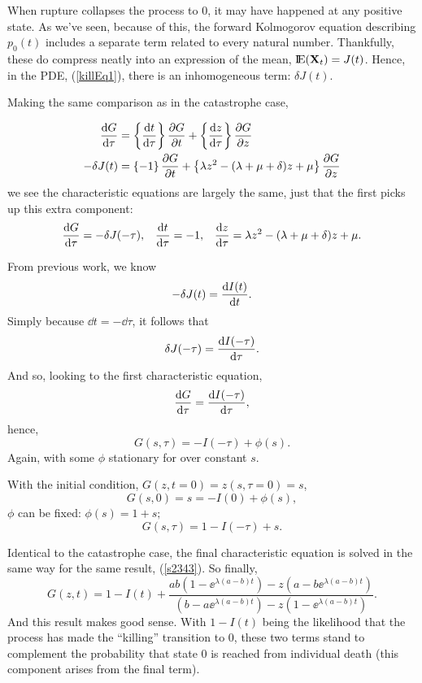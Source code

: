 When rupture collapses the process to 0, it may have happened at any positive state.  As we've seen, because of this, the forward Kolmogorov equation describing $p_0(t)$ includes a separate term related to every natural number. Thankfully, these do compress neatly into an expression of the mean, ${\rm I}\!{\rm E}({{\bf X}_t}) = J(t)$. Hence, in the PDE, (\ref{killEq1}), there is an inhomogeneous term: $\delta J(t)$.\par
Making the same comparison as in the catastrophe case, 

\begin{align*}
\displaystyle\frac{{\rm d} G}{{\rm d} \tau} &=  \left\{\displaystyle\frac{{\rm d} t}{{\rm d} \tau}\right\}  \displaystyle\frac{\partial G}{\partial t}+ \left\{\displaystyle\frac{{\rm d} z}{{\rm d} \tau} \right\}\displaystyle\frac{\partial G}{\partial z}\\
-\delta J(t)&=  \left\{- 1\right\}\displaystyle\frac{\partial G}{\partial t} + \left\{\lambda z^2 -( \lambda + \mu + \delta)z + \mu\right\} \displaystyle\frac{\partial G}{\partial z}
\end{align*}
we see the characteristic equations are largely the same, just that the first picks up this extra component: 
\begin{align*}
\label{Char2}
\displaystyle\frac{{\rm d} G}{{\rm d} \tau} = -\delta J(-\tau),&& \displaystyle\frac{{\rm d} t}{{\rm d} \tau} = -1, && \displaystyle\frac{{\rm d} z}{{\rm d} \tau} = \lambda z^2 - (\lambda + \mu + \delta)z + \mu.
\end{align*}



\noindent
From previous work, we know 
$$-\delta J(t) = \displaystyle\frac{{\rm d} I(t)}{{\rm d} t}.$$
Simply because $\dd t = -\dd \tau$, it follows that 
$$\delta J(-\tau) = \displaystyle\frac{{\rm d} I(-\tau)}{{\rm d} \tau}.$$
And so, looking to the first characteristic equation, 
$$\displaystyle\frac{{\rm d} G}{{\rm d} \tau} = \displaystyle\frac{{\rm d} I(-\tau)}{{\rm d} \tau},$$
hence,
$$G(s,\tau) = -I(-\tau) + \phi(s).$$
Again, with some $\phi$ stationary for over constant $s$. \par
With the initial condition, $G(z, t=0) = z(s, \tau = 0) = s$,
$$G(s,0) =s= -I(0) + \phi(s),$$
$\phi$ can be fixed: $\phi(s) = 1 + s;$
$$G(s,\tau) = 1 - I(-\tau) + s.$$\par
Identical to the catastrophe case, the final characteristic equation is solved in the same way for the same result, (\ref{s2343}). So finally,
$$G(z,t) = 1 - I(t)  + \frac{ab(1-\ee^{\lambda(a-b) t}) - z(a-b\ee^{\lambda(a-b) t}) } {  (b-a\ee^{\lambda(a-b) t}) -z(1-\ee^{\lambda(a-b) t})  }.$$
And this result makes good sense. With $1 - I(t)$ being the likelihood that the process has made the ``killing'' transition to 0, these two terms stand to complement the probability that state $0$ is reached from individual death (this component arises from the final term).

